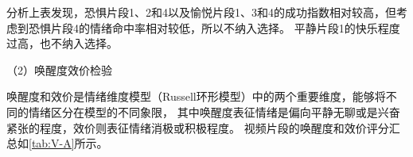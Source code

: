 分析上表发现，恐惧片段1、2和4以及愉悦片段1、3和4的成功指数相对较高，但考虑到恐惧片段4的情绪命中率相对较低，所以不纳入选择。
平静片段1的快乐程度过高，也不纳入选择。

（2）唤醒度效价检验

唤醒度和效价是情绪维度模型（Russell环形模型\cite{Russell1980}）中的两个重要维度，能够将不同的情绪区分在模型的不同象限，
其中唤醒度表征情绪是偏向平静无聊或是兴奋紧张的程度，效价则表征情绪消极或积极程度。
视频片段的唤醒度和效价评分汇总如\autoref{tab:V-A}所示。

\begin{table}[htbp]
    \centering
    \footnotesize
    \setlength{\abovecaptionskip}{0.1cm}
    \setlength{\belowcaptionskip}{0.2cm}
    \renewcommand\arraystretch{1.5}
    \caption[视频唤醒度效价检验结果]{视频唤醒度效价检验结果}
    \label{tab:V-A}
\end{table}
\vspace{-2ex}

